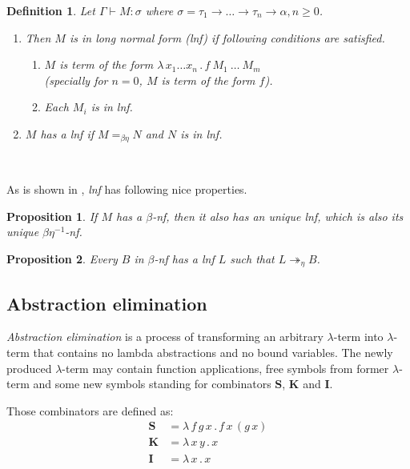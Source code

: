 \documentclass[11pt]{article}
\newtheorem{definition}{Definition}
\newtheorem{proposition}{Proposition}
\newcommand{\lterm}{$\lambda$-term\xspace}
\newcommand{\turst}[3]{$#1\vdash{}#2:#3$\xspace}
\newcommand{\GMS}{\turst{\Gamma}{M}{\sigma}}
\newcommand{\lam}[2]{\lambda \, #1 \, . \, #2}
\newcommand{\Scomb }{\mathbf{S}}
\newcommand{\Kcomb }{\mathbf{K}}
\newcommand{\Icomb }{\mathbf{I}}
\newcommand{\bnf}{$\beta$-\textit{nf}\xspace}
\newcommand{\beenf}{$\beta\eta^{-1}$-\textit{nf}\xspace}
\newcommand{\lnf}{\textit{lnf}\xspace}
\newcommand{\ar}{\rightarrow\xspace}
\begin{document}
\begin{article}
\begin{definition}
Let \GMS where 
$\sigma = \tau_1 \ar \dots \ar \tau_n \ar \alpha, n \geq 0$.
	\begin{enumerate}
	  \item	
		Then $M$ is in \textit{long normal form} (\lnf) if following 
		conditions are satisfied.
		\begin{enumerate}
		 \item $M$ is term of the form $\lam{x_1 \dots x_n}{f~M_1~\dots~M_m}$\\
		  (specially for $n = 0$, $M$ is term of the form $f$).
		 \item Each $M_i$ is in \lnf.
		\end{enumerate}	
	  \item 
	    $M$ has a \lnf if $M =_{\beta\eta} N$ and $N$ is in \lnf.
	\end{enumerate}
\end{definition}~

As is shown in \cite{barendregt10}, \lnf has following nice properties.

\begin{proposition}
If $M$ has a \bnf, 
then it also has an unique \lnf, 
which is also its unique \beenf.
\end{proposition}

\begin{proposition}
Every $B$ in \bnf has a \lnf 
$L$ such that $L \twoheadrightarrow_{\eta} B$.
\end{proposition}

\subsection{Abstraction elimination}
\textit{Abstraction elimination} is a process of transforming 
an arbitrary \lterm into \lterm that contains no lambda abstractions
and no bound variables.
The newly produced \lterm may contain function applications, 
free symbols from former \lterm and some new symbols standing for 
combinators $\Scomb$, $\Kcomb$ and $\Icomb$.

Those combinators are defined as:
\begin{align*}
\Scomb &= \lam{f\,g\,x}{f\,x\,(g\,x)} \\
\Kcomb &= \lam{x\,y}{x} \\
\Icomb &= \lam{x}{x} 
\end{align*}



\end{article}
\end{document}
